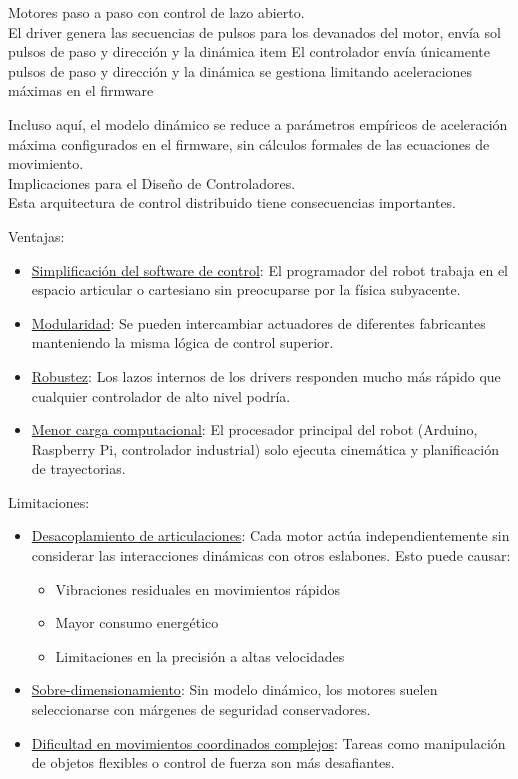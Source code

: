 Motores paso a paso con control de lazo abierto.\\
\noindent
El driver genera las secuencias de pulsos para los devanados del motor, envía sol pulsos de paso y dirección y la dinámica item El controlador envía únicamente pulsos de paso y dirección y la dinámica se gestiona limitando aceleraciones máximas en el firmware

Incluso aquí, el modelo dinámico se reduce a parámetros empíricos de aceleración máxima configurados en el firmware, sin cálculos formales de las ecuaciones de movimiento.\\

Implicaciones para el Diseño de Controladores.\\
\noindent
Esta arquitectura de control distribuido tiene consecuencias importantes.

Ventajas:

\begin{itemize}[label=$\bullet$]
    \item \underline{Simplificación del software de control}: El programador del robot trabaja en el espacio articular o cartesiano sin preocuparse por la física subyacente.

    \item \underline{Modularidad}: Se pueden intercambiar actuadores de diferentes fabricantes manteniendo la misma lógica de control superior.

    \item \underline{Robustez}: Los lazos internos de los drivers responden mucho más rápido que cualquier controlador de alto nivel podría.

    \item \underline{Menor carga computacional}: El procesador principal del robot (Arduino, Raspberry Pi, controlador industrial) solo ejecuta cinemática y planificación de trayectorias.
\end{itemize}

Limitaciones:

\begin{itemize}[label=$\bullet$]
    \item \underline{Desacoplamiento de articulaciones}: Cada motor actúa independientemente sin considerar las interacciones dinámicas con otros eslabones. Esto puede causar:
    \begin{itemize}[label=$\bullet$]
        \item Vibraciones residuales en movimientos rápidos
        \item Mayor consumo energético
        \item Limitaciones en la precisión a altas velocidades
    \end{itemize}

    \item \underline{Sobre-dimensionamiento}: Sin modelo dinámico, los motores suelen seleccionarse con márgenes de seguridad conservadores.

    \item \underline{Dificultad en movimientos coordinados complejos}: Tareas como manipulación de objetos flexibles o control de fuerza son más desafiantes.
\end{itemize}

